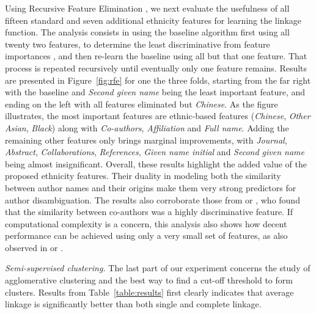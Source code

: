 \documentclass{article}
\begin{document}
Using Recursive Feature Elimination \cite{guyon2002gene}, we next evaluate the
usefulness of all fifteen standard and seven additional ethnicity features for learning
the linkage function. The analysis consists in using the baseline algorithm
first using all twenty two features, to determine the least discriminative from feature
importances \citep{louppe2013understanding}, and then re-learn the baseline
using all but that one feature. That process is repeated recursively until
eventually only one feature remains. Results are presented in
Figure~\ref{fig:rfe} for one the three folds, starting from the far right with
the baseline and \textit{Second given name} being the least important feature,
and ending on the left with all features eliminated but \textit{Chinese}. As
the figure illustrates, the most important features are ethnic-based features
(\textit{Chinese}, \textit{Other Asian}, \textit{Black}) along with
\textit{Co-authors}, \textit{Affiliation} and \textit{Full name}. Adding the remaining
other features only brings marginal improvements, with \textit{Journal},
\textit{Abstract}, \textit{Collaborations}, \textit{References}, \textit{Given
name initial} and \textit{Second given name} being almost insignificant.
Overall, these results highlight the added value of the proposed ethnicity
features.
Their duality in modeling both the similarity between author names
and their origins make them very strong predictors for author disambiguation.
The results also corroborate those from \citep{kang2009co} or \citep{ferreira2010effective}, who
found that the similarity between co-authors was a highly discriminative
feature.
If computational complexity is a concern, this analysis also
shows how decent performance can be achieved using only a very
small set of features, as also observed in
\citep{treeratpituk2009disambiguating} or \citep{levin2012citation}.

\textit{Semi-supervised clustering.} The last part of our experiment concerns
the study of agglomerative clustering and the best way to find a cut-off
threshold to form clusters. Results from Table~\ref{table:results}
first clearly indicates that average linkage is significantly better than
both single and complete linkage.
\end{document}
